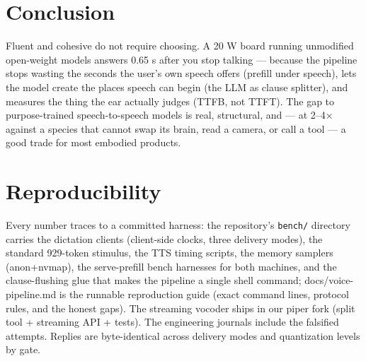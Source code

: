 \documentclass{article}
\begin{document}
\section{Conclusion}

Fluent and cohesive do not require choosing. A 20 W board running unmodified open-weight models answers 0.65 s after you stop talking --- because the pipeline stops wasting the seconds the user's own speech offers (prefill under speech), lets the model create the places speech can begin (the LLM as clause splitter), and measures the thing the ear actually judges (TTFB, not TTFT). The gap to purpose-trained speech-to-speech models is real, structural, and --- at 2--4× against a species that cannot swap its brain, read a camera, or call a tool --- a good trade for most embodied products.

\appendix

\section{Reproducibility}

Every number traces to a committed harness: the repository's \verb|bench/| directory carries the dictation clients (client-side clocks, three delivery modes), the standard 929-token stimulus, the TTS timing scripts, the memory samplers (anon+nvmap), the serve-prefill bench harnesses for both machines, and the clause-flushing glue that makes the pipeline a single shell command; docs/voice-pipeline.md is the runnable reproduction guide (exact command lines, protocol rules, and the honest gaps). The streaming vocoder ships in our piper fork (split tool + streaming API + tests). The engineering journals include the falsified attempts. Replies are byte-identical across delivery modes and quantization levels by gate.
\end{document}
